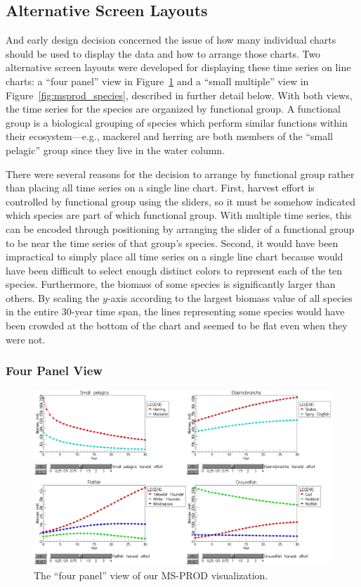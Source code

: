 \subsection{Alternative Screen Layouts}

And early design decision concerned the issue of how many individual charts should be used to display the data and how to arrange those charts.  Two alternative screen layouts were developed for displaying these time series on line charts: a ``four panel'' view in Figure~\ref{fig:msprod_group} and a ``small multiple'' view in Figure~\ref{fig:msprod_species}, described in further detail below.  With both views, the time series for the species are organized by functional group.  A functional group is a biological grouping of species which perform similar functions within their ecosystem---e.g., mackerel and herring are both members of the ``small pelagic'' group since they live in the water column.

There were several reasons for the decision to arrange by functional group rather than placing all time series on a single line chart.  First, harvest effort is controlled by functional group using the sliders, so it must be somehow indicated which species are part of which functional group.  With multiple time series, this can be encoded through positioning by arranging the slider of a functional group to be near the time series of that group's species.  Second, it would have been impractical to simply place all time series on a single line chart because would have been difficult to select enough distinct colors to represent each of the ten species.  Furthermore, the biomass of some species is significantly larger than others.  By scaling the $y$-axis according to the largest biomass value of all species in the entire 30-year time span, the lines representing some species would have been crowded at the bottom of the chart and seemed to be flat even when they were not.

\subsubsection{Four Panel View}

\begin{figure}[h]
	\centering
	\includegraphics[width=14cm]{figures/png/msprod_group.png}
	\caption[The ``four panel'' view of our MS-PROD visualization]{The ``four panel'' view of our MS-PROD visualization.}
	\label{fig:msprod_group}
\end{figure}

